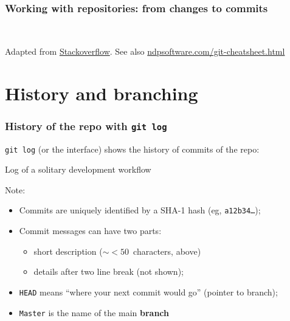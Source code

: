 \documentclass[10pt,svgnames,handout]{beamer}
\begin{document}
\begin{frame}
\frametitle{Working with repositories: from changes to commits}
\\
\begin{small}
Adapted from \href{https://tex.stackexchange.com/a/70332/14260}{Stackoverflow}. See also \href{http://ndpsoftware.com/git-cheatsheet.html}{ndpsoftware.com/git-cheatsheet.html}
\end{small}

\end{frame}



\section{History and branching}

\begin{frame}
\frametitle{History of the repo with \lstinline{git log}}

\lstinline{git log} (or the interface) shows the history of commits of the repo: \pause

\begin{block}{Log of a solitary development workflow}

\end{block}
\smallskip
\pause
Note:
\begin{itemize}
  \item Commits are uniquely identified by a SHA-1 hash (eg, \texttt{a12b34\ldots});
  \item Commit messages can have two parts:
  \begin{itemize}
    \item short description ($\sim<50$~characters, above)
    \item details after two line break (not shown);
  \end{itemize}
  \item \lstinline{HEAD} means “where your next commit would go” (pointer to branch);
  \item \lstinline{Master} is the name of the main \textbf{branch}
\end{itemize}
\end{frame}
\end{document}

